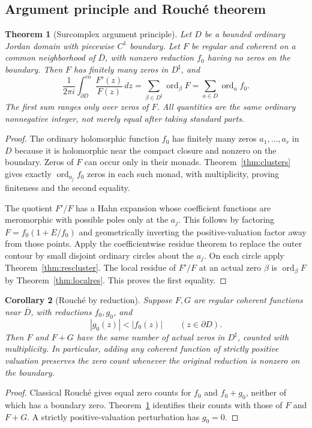 \documentclass[11pt,a4paper]{article}
\numberwithin{equation}{section}
\newtheorem{theorem}{Theorem}[section]
\newtheorem{corollary}[theorem]{Corollary}
\theoremstyle{definition}
\theoremstyle{remark}
\newcommand{\ord}{\operatorname{ord}}
\newcommand{\co}{\mathrm{co}}
\begin{document}
\subsection{Argument principle and Rouch\'e theorem}
\begin{theorem}[Surcomplex argument principle]
\label{thm:argument}
Let $D$ be a bounded ordinary Jordan domain with piecewise $C^1$ boundary. Let $F$ be regular and coherent on a common neighborhood of $\overline D$, with nonzero reduction $f_0$ having no zeros on the boundary. Then $F$ has finitely many zeros in $D^\sharp$, and
\begin{equation}
\label{eq:argument}
 \frac1{2\pi i}\int_{\partial D}^{\co}\frac{F'(z)}{F(z)}\,dz
 =\sum_{\beta\in D^\sharp}\ord_\beta F
 =\sum_{a\in D}\ord_a f_0.
\end{equation}
The first sum ranges only over zeros of $F$. All quantities are the same ordinary nonnegative integer, not merely equal after taking standard parts.
\end{theorem}
\begin{proof}
The ordinary holomorphic function $f_0$ has finitely many zeros $a_1,\ldots,a_r$ in $D$ because it is holomorphic near the compact closure and nonzero on the boundary. Zeros of $F$ can occur only in their monads. Theorem~\ref{thm:clusters} gives exactly $\ord_{a_j}f_0$ zeros in each such monad, with multiplicity, proving finiteness and the second equality.

The quotient $F'/F$ has a Hahn expansion whose coefficient functions are meromorphic with possible poles only at the $a_j$. This follows by factoring $F=f_0(1+E/f_0)$ and geometrically inverting the positive-valuation factor away from those points. Apply the coefficientwise residue theorem to replace the outer contour by small disjoint ordinary circles about the $a_j$. On each circle apply Theorem~\ref{thm:rescluster}. The local residue of $F'/F$ at an actual zero $\beta$ is $\ord_\beta F$ by Theorem~\ref{thm:localres}. This proves the first equality.
\end{proof}

\begin{corollary}[Rouch\'e by reduction]
\label{cor:rouche}
Suppose $F,G$ are regular coherent functions near $\overline D$, with reductions $f_0,g_0$, and
\[
 |g_0(z)|<|f_0(z)|\qquad(z\in\partial D).
\]
Then $F$ and $F+G$ have the same number of actual zeros in $D^\sharp$, counted with multiplicity. In particular, adding any coherent function of strictly positive valuation preserves the zero count whenever the original reduction is nonzero on the boundary.
\end{corollary}
\begin{proof}
Classical Rouch\'e gives equal zero counts for $f_0$ and $f_0+g_0$, neither of which has a boundary zero. Theorem~\ref{thm:argument} identifies their counts with those of $F$ and $F+G$. A strictly positive-valuation perturbation has $g_0=0$.
\end{proof}
\end{document}
